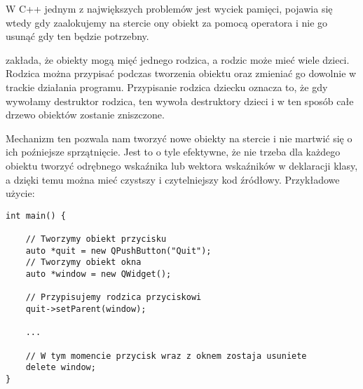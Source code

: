 
\par
W C++ jednym z największych problemów jest wyciek pamięci, pojawia się wtedy gdy zaalokujemy na stercie ony obiekt za pomocą operatora  i nie go usunąć gdy ten będzie potrzebny.
\par
{} zakłada, że obiekty mogą mięć jednego rodzica, a rodzic może mieć wiele dzieci.
Rodzica można przypisać podczas tworzenia obiektu oraz zmieniać go dowolnie w trackie działania programu.
Przypisanie rodzica dziecku oznacza to, że gdy wywołamy destruktor rodzica, ten wywoła destruktory dzieci i w ten sposób całe drzewo obiektów zostanie zniszczone.
\par
Mechanizm ten pozwala nam tworzyć nowe obiekty na stercie i nie martwić się o ich poźniejsze sprzątnięcie.
Jest to o tyle efektywne, że nie trzeba dla każdego obiektu tworzyć odrębnego wskaźnika lub wektora wskaźników w deklaracji klasy, a dzięki temu można mieć czystszy i czytelniejszy kod źródłowy.
Przykładowe użycie:
\par
\begin{lstlisting}
int main() {

    // Tworzymy obiekt przycisku
    auto *quit = new QPushButton("Quit");
    // Tworzymy obiekt okna
    auto *window = new QWidget();

    // Przypisujemy rodzica przyciskowi
    quit->setParent(window);
    
    ...

    // W tym momencie przycisk wraz z oknem zostaja usuniete
    delete window;
}
\end{lstlisting}